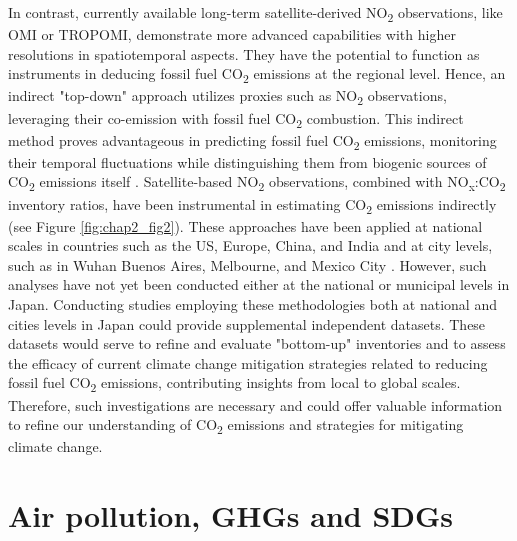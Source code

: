 In contrast, currently available long-term satellite-derived NO\textsubscript{2} observations, like OMI or TROPOMI, demonstrate more advanced capabilities with higher resolutions in spatiotemporal aspects. They have the potential to function as instruments in deducing fossil fuel CO\textsubscript{2} emissions at the regional level. Hence, an indirect "top-down" approach utilizes proxies such as NO\textsubscript{2} observations, leveraging their co-emission with fossil fuel CO\textsubscript{2} combustion. This indirect method proves advantageous in predicting fossil fuel CO\textsubscript{2} emissions, monitoring their temporal fluctuations while distinguishing them from biogenic sources of CO\textsubscript{2} emissions itself \citep{ciais2014current, goldberg2019exploiting}. Satellite-based NO\textsubscript{2} observations, combined with NO\textsubscript{x}:CO\textsubscript{2} inventory ratios, have been instrumental in estimating CO\textsubscript{2} emissions indirectly (see Figure \ref{fig:chap2_fig2}). These approaches have been applied at national scales in countries such as the US, Europe, China, and India \citep{konovalov2016estimation, zheng2020satellite, miyazaki2023predictability} and at city levels, such as in Wuhan \citep{zhang2023quantifying} Buenos Aires, Melbourne, and Mexico City \citep{yang2023using}. However, such analyses have not yet been conducted either at the national or municipal levels in Japan. Conducting studies employing these methodologies both at national and cities levels in Japan could provide supplemental independent datasets. These datasets would serve to refine and evaluate "bottom-up" inventories and to assess the efficacy of current climate change mitigation strategies related to reducing fossil fuel CO\textsubscript{2} emissions, contributing insights from local to global scales. Therefore, such investigations are necessary and could offer valuable information to refine our understanding of CO\textsubscript{2} emissions and strategies for mitigating climate change. \par

\section{Air pollution, GHGs and SDGs}

